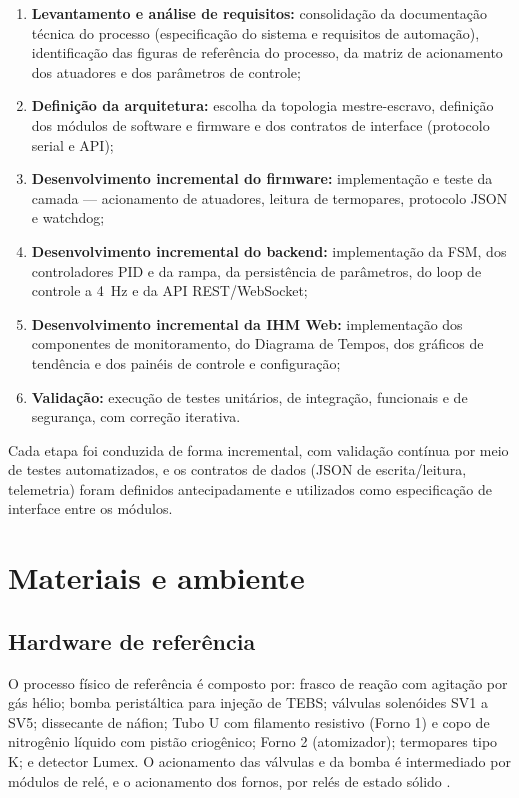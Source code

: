 \begin{enumerate}[label=\arabic*)]
  \item \textbf{Levantamento e análise de requisitos:} consolidação da
  documentação técnica do processo (especificação do sistema e requisitos de
  automação), identificação das figuras de referência do processo, da matriz de
  acionamento dos atuadores e dos parâmetros de controle;
  \item \textbf{Definição da arquitetura:} escolha da topologia mestre-escravo,
  definição dos módulos de software e firmware e dos contratos de interface
  (protocolo serial e API);
  \item \textbf{Desenvolvimento incremental do firmware:} implementação e teste
  da camada \daq --- acionamento de atuadores, leitura de termopares, protocolo
  JSON e watchdog;
  \item \textbf{Desenvolvimento incremental do backend:} implementação da FSM,
  dos controladores PID e da rampa, da persistência de parâmetros, do loop de
  controle a 4~Hz e da API REST/WebSocket;
  \item \textbf{Desenvolvimento incremental da IHM Web:} implementação dos
  componentes de monitoramento, do Diagrama de Tempos, dos gráficos de tendência
  e dos painéis de controle e configuração;
  \item \textbf{Validação:} execução de testes unitários, de integração,
  funcionais e de segurança, com correção iterativa.
\end{enumerate}

Cada etapa foi conduzida de forma incremental, com validação contínua por meio de
testes automatizados, e os contratos de dados (JSON de escrita/leitura,
telemetria) foram definidos antecipadamente e utilizados como especificação de
interface entre os módulos.

\section{Materiais e ambiente}

\subsection{Hardware de referência}

O processo físico de referência é composto por: frasco de reação com agitação
por gás hélio; bomba peristáltica para injeção de TEBS; v\'alvulas solen\'oides
SV1 a SV5; dissecante de n\'afion; Tubo U com filamento resistivo (Forno 1) e
copo de nitrog\^enio l\'iquido com pist\~ao criog\^enico; Forno 2 (atomizador);
termopares tipo K; e detector Lumex. O acionamento das v\'alvulas e da bomba \'e
intermediado por m\'odulos de rel\'e, e o acionamento dos fornos, por rel\'es de
estado s\'olido \cite{arduino, lumex}.

